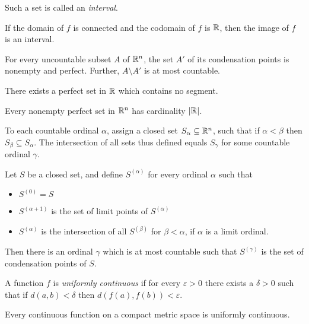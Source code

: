\begin{defn}
    Such a set is called an \emph{interval}. 
\end{defn}
\begin{cor}
    If the domain of $f$ is connected and the codomain of $f$ is $\mathbb{R}$, then the
    image of $f$ is an interval.
\end{cor}
\begin{prop}
    For every uncountable subset $A$ of $\mathbb{R}^n$, the set $A'$ of its condensation
    points is nonempty and perfect. Further, $A\setminus A'$ is at most
    countable.
\end{prop}
\begin{prop}
    There exists a perfect set in $\mathbb{R}$ which contains no segment.
\end{prop}
\begin{prop}
    Every nonempty perfect set in $\mathbb{R}^n$ has cardinality $|\mathbb{R}|$.
\end{prop}
\begin{thm}[Baire]
    To each countable ordinal $\alpha$, assign a closed set
    $S_\alpha\subseteq\mathbb{R}^n$, such that if $\alpha<\beta$ then $S_\beta\subseteq S_\alpha$.
    The intersection of all sets thus defined equals $S_\gamma$ for some
    countable ordinal $\gamma$.
\end{thm}
\begin{cor}
    Let $S$ be a closed set, and define $S^{(\alpha)}$ for every ordinal
    $\alpha$ such that
    \begin{itemize}
        \item $S^{(0)}=S$
        \item $S^{(\alpha+1)}$ is the set of limit points of $S^{(\alpha)}$
        \item $S^{(\alpha)}$ is the intersection of all $S^{(\beta)}$ for
            $\beta<\alpha$, if $\alpha$ is a limit ordinal.
    \end{itemize}
    Then there is an ordinal $\gamma$ which is at most countable such that
    $S^{(\gamma)}$ is the set of condensation points of $S$.
\end{cor}
\begin{defn}
  A function $f$ is \emph{uniformly continuous} if for every $\varepsilon>0$
  there exists a $\delta>0$ such that if $d(a,b)<\delta$ then
  $d(f(a),f(b))<\varepsilon$.
\end{defn}
\begin{thm}
  Every continuous function on a compact metric space is uniformly continuous.
\end{thm}
